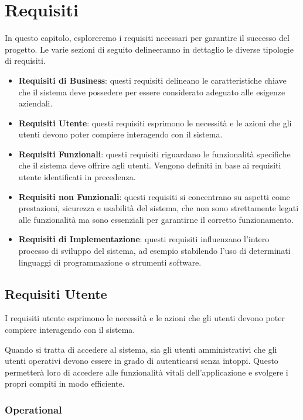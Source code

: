 \section{Requisiti}

In questo capitolo, esploreremo i requisiti necessari per garantire il successo del progetto.
Le varie sezioni di seguito delineeranno in dettaglio le diverse tipologie di requisiti.

\begin{itemize}
    \item \textbf{Requisiti di Business}: questi requisiti delineano le caratteristiche chiave che il sistema deve possedere per essere considerato adeguato alle esigenze aziendali.
    \item \textbf{Requisiti Utente}: questi requisiti esprimono le necessità e le azioni che gli utenti devono poter compiere interagendo con il sistema.
    \item \textbf{Requisiti Funzionali}: questi requisiti riguardano le funzionalità specifiche che il sistema deve offrire agli utenti. Vengono definiti in base ai requisiti utente identificati in precedenza.
    \item \textbf{Requisiti non Funzionali}: questi requisiti si concentrano su aspetti come prestazioni, sicurezza e usabilità del sistema, che non sono strettamente legati alle funzionalità ma sono essenziali per garantirne il corretto funzionamento.
    \item \textbf{Requisiti di Implementazione}: questi requisiti influenzano l'intero processo di sviluppo del sistema, ad esempio stabilendo l'uso di determinati linguaggi di programmazione o strumenti software.
\end{itemize}

\subsection{Requisiti Utente}

I requisiti utente esprimono le necessità e le azioni che gli utenti devono
poter compiere interagendo con il sistema.

Quando si tratta di accedere al sistema, sia gli utenti amministrativi che gli utenti
operativi devono essere in grado di autenticarsi senza intoppi. Questo permetterà loro di
accedere alle funzionalità vitali dell'applicazione e svolgere i propri compiti in modo efficiente.

\subsubsection{Operational}

